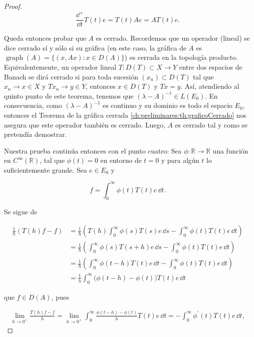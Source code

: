 \begin{proof}
    \[\frac{\dd^+}{\dd t}T(t)e = T(t)Ae = AT(t)e.\]

    Queda entonces probar que $A$ es cerrado. Recordemos que un operador (lineal) se dice cerrado sí y sólo si su gráfica (en este caso, la gráfica de $A$ es $\operatorname{graph}(A) = \{(x,Ax) : x \in D(A)\}$) es cerrada en la topología producto. Equivalentemente, un operador lineal $T : D(T) \subset X \rightarrow Y$ entre dos espacios de Banach se dirá cerrado si para toda sucesión $(x_n) \subset D(T)$ tal que $x_n \rightarrow x \in X$ y $Tx_n \rightarrow y \in Y$, entonces $x \in D(T)$ y $Tx = y$. Así, atendiendo al quinto punto de este teorema, tenemos que $(\lambda -A)^{-1} \in L(E_0)$. En consecuencia, como $(\lambda - A)^{-1}$ es continuo y su dominio es todo el espacio $E_0$, entonces el Teorema de la gráfica cerrada \ref{ch:preliminares:th:graficoCerrado} nos asegura que este operador también es cerrado. Luego, $A$ es cerrado tal y como se pretendía demostrar.

    Nuestra prueba continúa entonces con el punto cuatro: Sea $\phi : \mathbb{R} \rightarrow \mathbb{R}$ una función en $C^{\infty}(\mathbb{R})$, tal que $\phi(t) = 0$ en entorno de $t = 0$ y para algún $t$ lo suficientemente grande. Sea $e \in E_0$ y

    \[f = \int_0^\infty \phi(t) T(t) e \, \dd t.\]

    Se sigue de

    \begin{align*}
        \frac{1}{h}(T(h)f -f) &= \frac{1}{h}\left ( T(h)\int_0^\infty \phi(s) T(s) e \, \dd s - \int_0^\infty \phi(t) T(t) e \, \dd t \right )\\
        &= \frac{1}{h}\left ( \int_0^\infty \phi(s) T(s + h) e \, \dd s - \int_0^\infty \phi(t) T(t) e \, \dd t \right )\\
        &= \frac{1}{h}\left ( \int_0^\infty \phi(t-h) T(t) e \, \dd t - \int_0^\infty \phi(t) T(t) e \, \dd t \right )\\
        &= \frac{1}{h} \int_0^\infty \Big( \phi(t-h) - \phi(t) \Big ) T(t) e \, \dd t
    \end{align*}

    que $f \in D(A)$, pues

    \begin{align*}
        \lim_{h \rightarrow 0^+} \frac{T(h)f - f}{h} = \lim_{h \rightarrow 0^+}\int_0^\infty \frac{\phi(t-h) - \phi(t)}{h} T(t) e \, \dd t = - \int_0^\infty \phi^{\prime}(t) T(t)e \, \dd t,
    \end{align*}


\end{proof}
